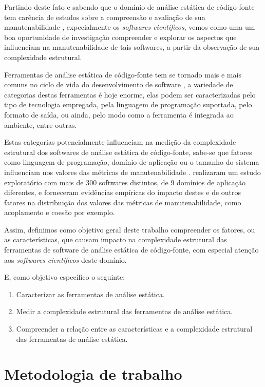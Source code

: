Partindo deste fato e sabendo que o domínio de análise estática de código-fonte
tem carência de estudos sobre a compreensão e avaliação de sua manutenabilidade
\cite{Li2010}, expecialmente os {\it softwares científicos}, vemos como uma um
boa oportunidade de investigação compreender e explorar os aspectos que
influenciam na manutenabilidade de tais softwares, a partir da observação de
sua complexidade estrutural.

Ferramentas de análise estática de código-fonte tem se tornado mais e mais
comuns no ciclo de vida do desenvolvimento de software \cite{Novak2010}, a
variedade de categorias destas ferramentas é hoje enorme, elas podem ser
caracterizadas pelo tipo de tecnologia empregada, pela linguagem de programação
suportada, pelo formato de saída, ou ainda, pelo modo como a ferramenta é
integrada ao ambiente, entre outras.

Estas categorias potencialmente influenciam na medição da complexidade
estrutural dos softwares de análise estática de código-fonte, sabe-se que
fatores como linguagem de programação, domínio de aplicação ou o tamanho do
sistema influenciam nos valores das métricas de manutenabilidade
\cite{Zhang2013}.  realizaram um estudo exploratório com
mais de 300 softwares distintos, de 9 domínios de aplicação diferentes, e
forneceram evidências empíricas do impacto destes e de outros fatores na
distribuição dos valores das métricas de manutenabilidade, como acoplamento e
coesão por exemplo. 

Assim, definimos como objetivo geral deste trabalho compreender os
fatores, ou as características, que causam impacto na complexidade estrutural
das ferramentas de software de análise estática de código-fonte, com especial
atenção aos {\it softwares científicos} deste domínio.

E, como objetivo específico o seguinte:

\begin{enumerate}
  \item Caracterizar as ferramentas de análise estática.
  \item Medir a complexidade estrutural das ferramentas de análise estática.
  \item Compreender a relação entre as características e a complexidade estrutural
        das ferramentas de análise estática.
\end{enumerate}

\section{Metodologia de trabalho}


